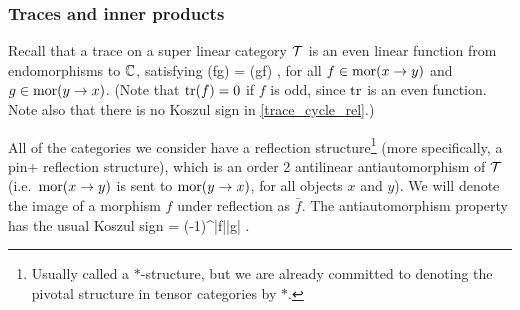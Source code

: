 \subsubsection{Traces and inner products} \label{traces_and_innerproducts}


Recall that a trace on a super linear category $\mathcal{T}$
is an even linear function from endomorphisms to $\mathbb{C}$, satisfying
\be  \label{trace_cycle_rel}
	\tr(fg) = \tr(gf) ,
\ee
for all $f \in \text{mor}(x\to y)$ and $g\in \text{mor}(y\to x)$.
(Note that $\text{tr}(f) = 0$ if $f$ is odd, since $\text{tr}$ is an even function.
Note also that there is no Koszul sign in \eqref{trace_cycle_rel}.)

All of the categories we consider have a reflection structure\footnote{Usually called a $*$-structure,
but we are already committed to denoting the pivotal structure in tensor categories by $*$.}
(more specifically, a pin+ reflection structure),
which is an order 2 antilinear antiautomorphism of $\mathcal{T}$
(i.e.\ $\text{mor}(x\to y)$ is sent to $\text{mor}(y\to x)$, for all objects $x$ and $y$).
We will denote the image of a morphism $f$ under reflection as $\bar f$.
The antiautomorphism property has the usual Koszul sign
\be
	 = (-1)^{|f||g|}   .
\ee

